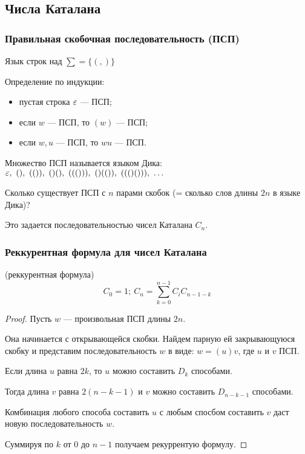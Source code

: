 \subsection{Числа Каталана}

\subsubsection*{Правильная скобочная последовательность (ПСП)}

\begin{defn}
    Язык строк над $\sum = \{ (, ) \}$

    Определение по индукции:

    \begin{itemize}
        \item пустая строка $\varepsilon$ --- ПСП;
        \item если $w$ --- ПСП, то $(w)$ --- ПСП;
        \item если $w, u$ --- ПСП, то $w u$ --- ПСП.
    \end{itemize}

    Множество ПСП называется языком Дика:\\
    $\varepsilon,~(),~(()),~()(),~((())),~()(()),~((()())),~\dots$
\end{defn}

Сколько существует ПСП с $n$ парами скобок (= сколько слов длины $2n$ в языке Дика)?

Это задается последовательностью чисел Каталана $C_n$.

\subsubsection*{Реккурентная формула для чисел Каталана}

\begin{theorem} (реккурентная формула)
    \[ C_0 = 1;~C_{n} = \sum_{k = 0}^{n - 1} C_i C_{n - 1 - k} \]
\end{theorem}

\begin{proof}
    Пусть $w$ --- произвольная ПСП длины $2n$.

    Она начинается с открывающейся скобки. Найдем парную ей закрывающуюся скобку и представим последовательность $w$ в виде: $w = (u)v$, где $u$ и $v$ ПСП.

    Если длина $u$ равна $2k$, то $u$ можно составить $D_k$ способами. 

    Тогда длина $v$ равна $2(n - k - 1)$ и $v$ можно составить $D_{n - k - 1}$ способами.

    Комбинация любого способа составить $u$ с любым спосбом составить $v$ даст новую последовательность $w$.

    Суммируя по $k$ от $0$ до $n - 1$ получаем рекуррентую формулу.
\end{proof}

